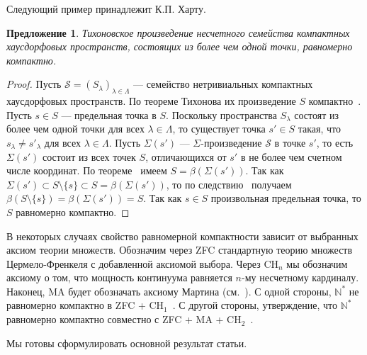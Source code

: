\documentclass[12pt]{article}
\newtheorem{proposition}[theorem]{Предложение}
\begin{document}
Следующий пример принадлежит К.П. Харту.

\begin{proposition}\label{UcountProdCompSpIsUnifComp} Тихоновское произведение
    несчетного семейства компактных хаусдорфовых пространств, состоящих из более
    чем одной точки, равномерно компактно.
\end{proposition}
\begin{proof} Пусть $\mathcal{S}={(S_\lambda)}_{\lambda\in\Lambda}$ ---
    семейство нетривиальных компактных хаусдорфовых пространств. По теореме
    Тихонова их произведение $S$ компактно~\cite[теорема 3.2.4]{EngkingGenTop}.
    Пусть $s\in S$ --- предельная точка в $S$. Поскольку пространства
    $S_\lambda$ состоят из более чем одной точки для всех $\lambda\in\Lambda$,
    то существует точка $s'\in S$ такая, что $s_\lambda\neq s'_\lambda$ для всех
    $\lambda\in\Lambda$. Пусть $\Sigma(s')$ --- $\Sigma$-произведение
    $\mathcal{S}$ в точке $s'$, то есть $\Sigma(s')$ состоит из всех точек $S$,
    отличающихся от $s'$ в не более чем счетном числе координат. По
    теореме~\cite[теорема 3.12.24(c)]{EngkingGenTop} имеем
    $S=\beta(\Sigma(s'))$. Так как $\Sigma(s')\subset S\setminus \{s\}\subset
        S=\beta(\Sigma(s'))$, то по следствию~\cite[следствие 3.6.9]{EngkingGenTop}
    получаем $\beta(S\setminus \{s\})=\beta(\Sigma(s'))=S$. Так как $s\in S$
    произвольная предельная точка, то $S$ равномерно компактно.
\end{proof}

В некоторых случаях свойство равномерной компактности зависит от выбранных
аксиом теории множеств. Обозначим через \textsc{ZFC} стандартную теорию множеств
Цермело-Френкеля с добавленной аксиомой выбора. Через \textsc{CH}$_n$ мы
обозначим аксиому о том, что мощность континуума равняется $n$-му несчетному
кардиналу. Наконец, \textsc{MA} будет обозначать аксиому Мартина
(см.~\cite{KunSetThIndepPrf}). С одной стороны, $\mathbb{N}^*$ не равномерно
компактно в \textsc{ZFC + CH$_1$}~\cite{FinGillExtContFuncbN}. С другой стороны,
утверждение, что $\mathbb{N}^*$ равномерно компактно совместно с \textsc{ZFC +
    MA + CH$_2$}~\cite{DouKunMillCStarEmbdDenPropSbspStoneRemN}.

Мы готовы сформулировать основной результат статьи.
\end{document}
